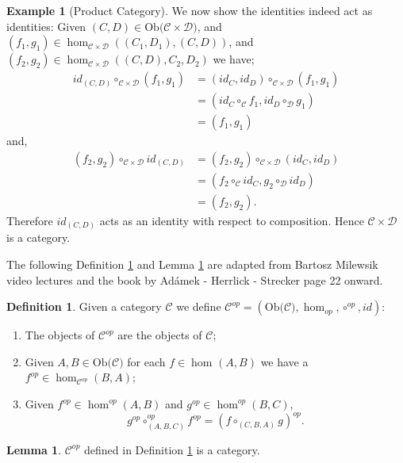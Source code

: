 \documentclass[11pt,a4paper]{article}
\theoremstyle{definition}
\newtheorem{lemma}[thm]{Lemma}
\newtheorem{definition}[thm]{Definition}
\newtheorem{example}[thm]{Example}
\newcommand\ho[3][]{\hom_{#1}(#2,#3)}
\newcommand\ob[1]{\mathrm{Ob(}#1\mathrm{)}}
\newcommand\cat[1]{\mathscr{#1}}
\numberwithin{equation}{section}
\begin{document}
\begin{example}[Product Category]
        We now show the identities indeed act as identities:
        Given $(C,D)\in\ob{\cat{C}\times\cat{D}}$, and $(f_{1},g_{1})\in\ho[\cat{C}\times\cat{D}]{(C_{1},D_{1})}{(C,D)}$, and $(f_{2},g_{2})\in\ho[\cat{C}\times\cat{D}]{(C,D)}{C_{2},D_{2}}$ we have;
        \begin{align*}
            id_{(C,D)}\circ_{\cat{C}\times\cat{D}}(f_{1},g_{1})&= (id_{C},id_{D})\circ_{\cat{C}\times\cat{D}}(f_{1},g_{1})\\
            &= (id_{C}\circ_{\cat{C}}f_{1},id_{D}\circ_{\cat{D}}g_{1})\\
            &= (f_{1},g_{1})
        \end{align*}
        and,
        \begin{align*}
            (f_{2},g_{2})\circ_{\cat{C}\times\cat{D}}id_{(C,D)}&= (f_{2},g_{2})\circ_{\cat{C}\times\cat{D}}(id_{C},id_{D})\\
            &= (f_{2}\circ_{\cat{C}}id_{C},g_{2}\circ_{\cat{D}}id_{D})\\
            &= (f_{2},g_{2}).
        \end{align*}
        Therefore $id_{(C,D)}$ acts as an identity with respect to composition. Hence $\cat{C}\times\cat{D}$ is a category.
\end{example}
The following Definition \ref{def:dualcategory} and Lemma \ref{lem:dualcatiscat} are adapted from Bartosz Milewsik video lectures \cite{Bartosz} and the book by Adámek - Herrlick - Strecker \cite{ACC} page 22 onward.
\begin{definition}
    \label{def:dualcategory}
    Given a category $\cat{C}$ we define $\cat{C}^{op} = (\ob{\cat{C}},\hom_{op}, \circ^{op},id)$: 
    \begin{enumerate}
    \item The objects of $\cat{C}^{op}$ are the objects of $\cat{C}$;
    \item Given $A,B\in\ob{\cat{C}}$ for each $f\in\ho{A}{B}$ we have a $f^{op}\in\ho[\cat{C}^{op}]{B}{A}$;
    \item Given $f^{op}\in\hom^{op}(A,B)$ and $g^{op}\in\hom^{op}(B,C)$,
    \[g^{op}\circ^{op}_{(A,B,C)}f^{op} = (f\circ_{(C,B,A)} g)^{op}.\]
    \end{enumerate}
\end{definition}
\begin{lemma}
    \label{lem:dualcatiscat}
    $\cat{C}^{op}$ defined in Definition \ref{def:dualcategory} is a category.
\end{lemma}
\end{document}
